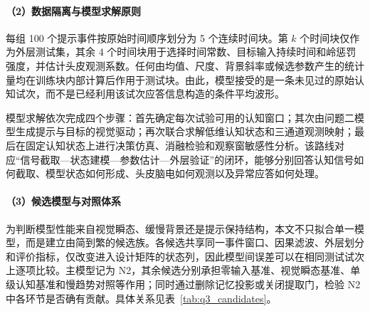 \documentclass[a4paper,zihao=-4,linespread=1]{ctexart}
\numberwithin{figure}{section}       %
\begin{document}
\paragraph{（2）数据隔离与模型求解原则}

每组 100 个提示事件按原始时间顺序划分为 5 个连续时间块。第 $k$ 个时间块仅作为外层测试集，其余 4 个时间块用于选择时间常数、目标输入持续时间和岭惩罚强度，并估计头皮观测系数。任何由均值、尺度、背景斜率或候选参数产生的统计量均在训练块内部计算后作用于测试块。由此，模型接受的是一条未见过的原始认知试次，而不是已经利用该试次应答信息构造的条件平均波形。

模型求解依次完成四个步骤：首先确定每次试验可用的认知窗口；其次由问题二模型生成提示与目标的视觉驱动；再次联合求解低维认知状态和三通道观测映射；最后在固定认知状态上进行决策仿真、消融检验和观察窗敏感性分析。该路线对应“信号截取---状态建模---参数估计---外层验证”的闭环，能够分别回答认知信号如何截取、模型状态如何形成、头皮脑电如何观测以及异常应答如何处理。

\paragraph{（3）候选模型与对照体系}

为判断模型性能来自视觉瞬态、缓慢背景还是提示保持结构，本文不只拟合单一模型，而是建立由简到繁的候选族。各候选共享同一事件窗口、因果滤波、外层划分和评价指标，仅改变进入设计矩阵的状态列，因此模型间误差可以在相同测试试次上逐项比较。主模型记为 N2，其余候选分别承担零输入基准、视觉瞬态基准、单级认知基准和慢趋势对照等作用；同时通过删除记忆投影或关闭提取门，检验 N2 中各环节是否确有贡献。具体关系见表~\ref{tab:q3_candidates}。

\begin{table}[H]
\centering
\caption{候选认知模型及对照表}
\label{tab:q3_candidates}
\end{table}
\end{document}
